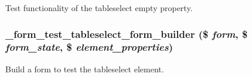 \label{form__test_8module_a6b3af3afe03e6da635cd4a22b97713af}
Test functionality of the tableselect empty property. \hypertarget{form__test_8module_a62dc6cc5d63bb5fb45df4f5ae1180420}{
\subsubsection[{\_\-form\_\-test\_\-tableselect\_\-form\_\-builder}]{\setlength{\rightskip}{0pt plus 5cm}\_\-form\_\-test\_\-tableselect\_\-form\_\-builder (\$ {\em form}, \/  \$ {\em form\_\-state}, \/  \$ {\em element\_\-properties})}}
\label{form__test_8module_a62dc6cc5d63bb5fb45df4f5ae1180420}
Build a form to test the tableselect element.


